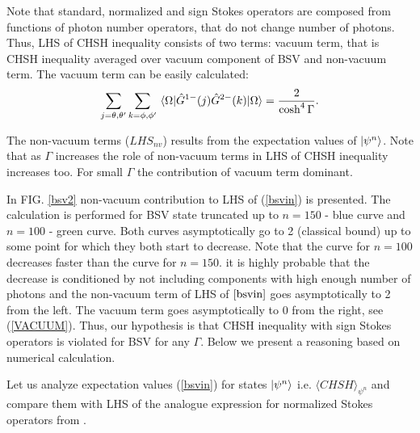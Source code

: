 \documentclass[aps,pra, twocolumn, showpacs]{revtex4-2}
\begin{document}
Note that standard, normalized and sign Stokes operators  are composed from functions of photon number operators, that do not change number of photons. Thus, LHS of CHSH inequality  consists of two terms:  {vacuum term}, that is CHSH inequality averaged over vacuum component of BSV and {non-vacuum term}.  
The vacuum term can be easily calculated:
\begin{equation}
\sum_{j= \theta,\theta'}\sum_{k=\phi,\phi'}\expval{\hat G^{1-}(j) \hat G^{2-}(k)}{\Omega} = \frac{2}{\cosh^4\Gamma}.
\label{VACUUM}
\end{equation}

The non-vacuum terms ($LHS_{nv}$)  results from the expectation values of $\ket{\psi^n}$.  Note that as $\Gamma$ increases the role of non-vacuum terms in LHS of  CHSH inequality increases too. For small $\Gamma$ the  contribution of vacuum term  dominant. 

In FIG. \ref{bsv2} non-vacuum contribution to LHS of (\ref{bsvin}) is presented. The calculation is performed for BSV state  truncated up to  $n=150$ - blue curve and $n=100$ - green curve. Both curves  asymptotically go to 2 (classical bound) up to some point for which they both start to decrease. Note that the curve for $n=100$ decreases faster than the curve for $n=150$.  it is highly probable that the decrease is conditioned by not including components with high enough number of photons and   the non-vacuum term of  LHS of $\ref{bsvin}$ goes asymptotically to 2 from the left. The vacuum term goes asymptotically to 0 from the right, see (\ref{VACUUM}). Thus, our hypothesis is that  CHSH inequality with  sign Stokes operators is violated for BSV for any $\Gamma$. Below we present a reasoning  based on numerical calculation.

Let us analyze expectation values (\ref{bsvin}) for states $\ket{\psi^n}$ i.e. $\langle CHSH\rangle_{\psi^n}$ and compare them with LHS of the analogue  expression for normalized Stokes operators from \cite{ZUKUBELL}.
\end{document}
